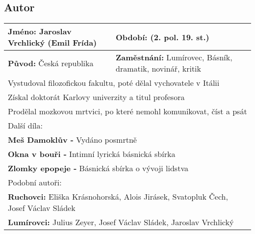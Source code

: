 \subsection*{Autor}
\begin{tabularx}{\linewidth}{l|l}
  \textbf{Jméno:} Jaroslav Vrchlický (Emil Frída) & \textbf{Období:} (2. pol. 19. st.)                                \\
  \hline
  \textbf{Původ:} Česká republika                 & \textbf{Zaměstnání:} Lumírovec, Básník, dramatik, novinář, kritik \\
  \hline
  \multicolumn{2}{l}{Vystudoval filozofickou fakultu, poté dělal vychovatele v Itálii}                                \\
  \multicolumn{2}{l}{Získal doktorát Karlovy univerzity a titul profesora}                                            \\
  \multicolumn{2}{l}{Prodělal mozkovou mrtvici, po které nemohl komunikovat, číst a psát}                             \\
  \hline
  \multicolumn{2}{l}{Další díla:}                                                                                     \\
  \multicolumn{2}{l}{\textbf{Meš Damoklův -} Vydáno posmrtně}                                                         \\
  \multicolumn{2}{l}{\textbf{Okna v bouři -} Intimní lyrická básnická sbírka}                                         \\
  \multicolumn{2}{l}{\textbf{Zlomky epopeje -} Básnická sbírka o vývoji lidstva}                                      \\
  \hline
  \multicolumn{2}{l}{Podobní autoři:}                                                                                 \\
  \multicolumn{2}{l}{\textbf{Ruchovci:} Eliška Krásnohorská, Alois Jirásek, Svatopluk Čech, Josef Václav Sládek}      \\
  \multicolumn{2}{l}{\textbf{Lumírovci:} Julius Zeyer, Josef Václav Sládek, Jaroslav Vrchlický}                       \\
\end{tabularx}

